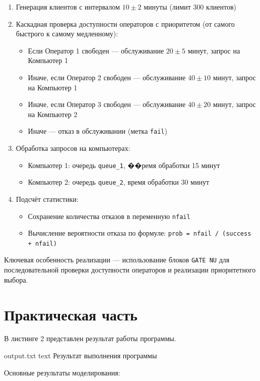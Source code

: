 \begin{enumerate}
    \item Генерация клиентов с интервалом $10 \pm 2$ минуты (лимит 300 клиентов)
    \item Каскадная проверка доступности операторов с приоритетом (от самого быстрого к самому медленному):
    \begin{itemize}
        \item Если Оператор 1 свободен — обслуживание $20 \pm 5$ минут, запрос на Компьютер 1
        \item Иначе, если Оператор 2 свободен — обслуживание $40 \pm 10$ минут, запрос на Компьютер 1
        \item Иначе, если Оператор 3 свободен — обслуживание $40 \pm 20$ минут, запрос на Компьютер 2
        \item Иначе — отказ в обслуживании (метка \texttt{fail})
    \end{itemize}
    \item Обработка запросов на компьютерах:
    \begin{itemize}
        \item Компьютер 1: очередь \texttt{queue\_1}, ��ремя обработки 15 минут
        \item Компьютер 2: очередь \texttt{queue\_2}, время обработки 30 минут
    \end{itemize}
    \item Подсчёт статистики:
    \begin{itemize}
        \item Сохранение количества отказов в переменную \texttt{nfail}
        \item Вычисление вероятности отказа по формуле: \texttt{prob = nfail / (success + nfail)}
    \end{itemize}
\end{enumerate}

Ключевая особенность реализации — использование блоков \texttt{GATE NU} для последовательной проверки доступности операторов и реализации приоритетного выбора.

\section{Практическая часть}

В листинге 2 представлен результат работы программы.

    {output.txt}
    {text}
    {Результат выполнения программы}

Основные результаты моделирования:

